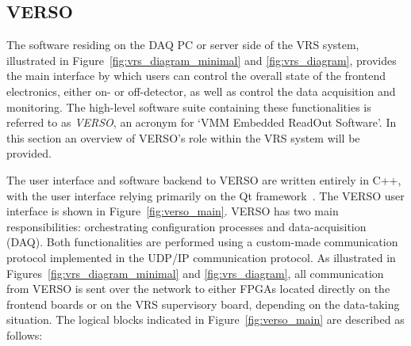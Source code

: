 \subsection{VERSO}
\label{sec:verso}

The software residing on the DAQ PC or server side of the VRS system,
illustrated in Figure~\ref{fig:vrs_diagram_minimal} and \ref{fig:vrs_diagram},
provides the main interface by which users can control the overall
state of the frontend electronics, either on- or off-detector,
as well as control the data acquisition and monitoring.
The high-level software suite containing these functionalities is referred
to as \textit{VERSO}, an acronym for `VMM Embedded ReadOut Software'.
In this section an overview of VERSO's role within the VRS system will be provided.

The user interface and software backend to VERSO are written entirely in C++,
with the user interface relying primarily on the Qt framework~\cite{QtCompany}.
The VERSO user interface is shown in Figure~\ref{fig:verso_main}.
VERSO has two main responsibilities: orchestrating configuration processes and
data-acquisition (DAQ).
Both functionalities are performed using a custom-made communication protocol
implemented in the UDP/IP communication protocol.
As illustrated in Figures~\ref{fig:vrs_diagram_minimal} and \ref{fig:vrs_diagram},
all communication from VERSO is sent over the network to either FPGAs located directly
on the frontend boards or on the VRS supervisory board, depending on the
data-taking situation.
The logical blocks indicated in Figure~\ref{fig:verso_main} are described as follows:

